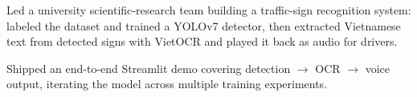 
\vspace{3pt}
\begin{resume_list}
  \item Led a university scientific-research team building a traffic-sign recognition system: labeled the dataset and trained a YOLOv7 detector, then extracted Vietnamese text from detected signs with VietOCR and played it back as audio for drivers.
  \item Shipped an end-to-end Streamlit demo covering detection $\rightarrow$ OCR $\rightarrow$ voice output, iterating the model across multiple training experiments.
\end{resume_list}
